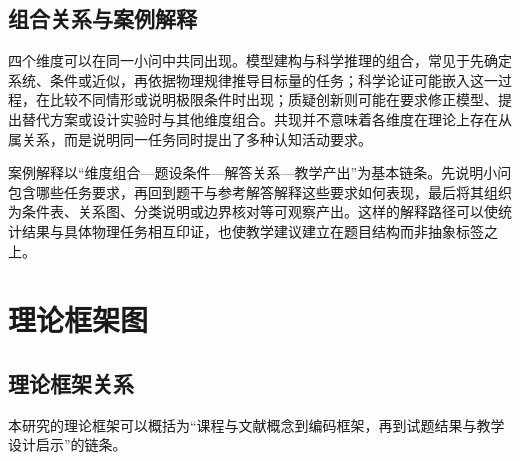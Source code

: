 \documentclass[
  12pt,
  a4paper,twoside,openany]{ctexbook}
\begin{document}
\subsection{组合关系与案例解释}\label{ux7ec4ux5408ux5173ux7cfbux4e0eux6848ux4f8bux89e3ux91ca}

四个维度可以在同一小问中共同出现。模型建构与科学推理的组合，常见于先确定系统、条件或近似，再依据物理规律推导目标量的任务；科学论证可能嵌入这一过程，在比较不同情形或说明极限条件时出现；质疑创新则可能在要求修正模型、提出替代方案或设计实验时与其他维度组合。共现并不意味着各维度在理论上存在从属关系，而是说明同一任务同时提出了多种认知活动要求。

案例解释以``维度组合---题设条件---解答关系---教学产出''为基本链条。先说明小问包含哪些任务要求，再回到题干与参考解答解释这些要求如何表现，最后将其组织为条件表、关系图、分类说明或边界核对等可观察产出。这样的解释路径可以使统计结果与具体物理任务相互印证，也使教学建议建立在题目结构而非抽象标签之上。

\section{理论框架图}\label{ux7406ux8bbaux6846ux67b6ux56fe}

\subsection{理论框架关系}\label{ux7406ux8bbaux6846ux67b6ux5173ux7cfb}

本研究的理论框架可以概括为``课程与文献概念到编码框架，再到试题结果与教学设计启示''的链条。
\end{document}
